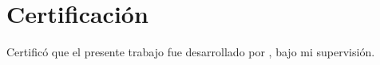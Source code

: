 \chapter*{Certificación}

Certificó que el presente trabajo fue desarrollado por \theauthor, bajo mi
supervisión.
